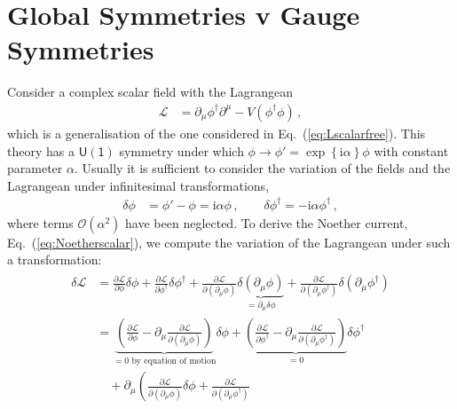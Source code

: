 \documentclass[12pt]{report}
\renewcommand{\L}{\ensuremath{\mathscr{L}}}
\renewcommand{\i}{\ensuremath{\text{i}}}
\newcommand{\2}{\ensuremath{\sqrt{2}\,}}
\renewcommand{\L}{\ensuremath{\mathscr{L}}}
\begin{document}
{    \section{Global Symmetries v Gauge Symmetries}
      Consider a complex scalar field with the Lagrangean
      \begin{align}\label{eq:Lscalar}
        \L&=\partial_\mu \phi^\dagger \partial^\mu - V\!\left(\phi^\dagger\phi\right)\,,
      \end{align}
      which is a generalisation of the one considered in Eq.~(\ref{eq:Lscalarfree}). This theory has a
      $\mathsf{U(1)}$ symmetry under which $\phi\to\phi' = \exp\!\left\{\i\alpha\right\}\phi$ with
      constant parameter $\alpha$. Usually it is sufficient to consider the variation of the fields
      and the Lagrangean under infinitesimal transformations,
      \begin{align}\label{eq:scalar_u1}
        \delta\phi &= \phi' -\phi = \i \alpha \phi \,,\qquad
        \delta\phi^\dagger= -\i\alpha \phi^\dagger\,,
      \end{align}
      where terms $\mathcal{O}\left(\alpha^2\right)$ have been neglected.
      To derive the Noether current, Eq.~(\ref{eq:Noetherscalar}), we
      compute the variation of the Lagrangean under such a transformation:
      \begin{align}\label{eq:derivation}
        \begin{split}
          \delta\L &= \frac{\partial \L}{\partial \phi}\delta \phi + \frac{\partial \L}{\partial
            \phi^\dagger}\delta \phi^\dagger +\frac{\partial \L}{\partial \left(\partial_\mu
              \phi\right)} \underbrace{\delta \left(\partial_\mu \phi\right)}_{=\partial_\mu
            \delta\phi} +\frac{\partial \L}{\partial \left(\partial_\mu \phi^\dagger\right)
          }\delta  \left(\partial_\mu \phi^\dagger\right)\\ 
          &= \underbrace{\left(\frac{\partial \L}{\partial \phi}- \partial_\mu \frac{\partial \L}{\partial
                \left(\partial_\mu \phi\right)}\right)}_{=0\text{ by equation of motion}} \delta
          \phi + \underbrace{\left(\frac{\partial \L}{\partial \phi^\dagger}- \partial_\mu
              \frac{\partial \L}{\partial \left(\partial_\mu \phi^\dagger\right)}\right)}_{=0}
          \delta \phi^\dagger\\ 
          &\quad + \partial_\mu \left(
            \frac{\partial \L}{\partial \left(\partial_\mu \phi\right)} \delta\phi
            +\frac{\partial \L}{\partial \left(\partial_\mu \phi^\dagger\right)}

\end{split}
\end{align}}
\end{document}

